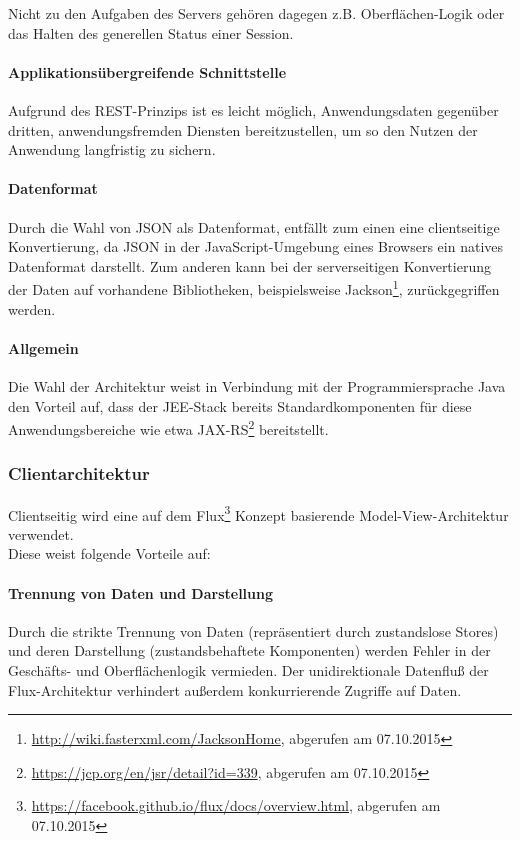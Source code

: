 \documentclass[12pt, xcolor=dvipsnames]{scrartcl}
\begin{document}
Nicht zu den Aufgaben des Servers gehören dagegen z.B. Oberflächen-Logik oder das Halten des generellen Status einer Session.

\paragraph{Applikationsübergreifende Schnittstelle}
Aufgrund des REST-Prinzips ist es leicht möglich, Anwendungsdaten gegenüber dritten, anwendungsfremden Diensten bereitzustellen, um so den Nutzen der Anwendung langfristig zu sichern.

\paragraph{Datenformat}
Durch die Wahl von JSON als Datenformat, entfällt zum einen eine clientseitige Konvertierung, da JSON in der JavaScript-Umgebung eines Browsers ein natives Datenformat darstellt. Zum anderen kann bei der serverseitigen Konvertierung der Daten auf vorhandene Bibliotheken, beispielsweise
Jackson\footnote{\url{http://wiki.fasterxml.com/JacksonHome}, abgerufen am 07.10.2015},
zurückgegriffen werden.

\paragraph{Allgemein}
Die Wahl der Architektur weist in Verbindung mit der Programmiersprache Java den Vorteil auf, dass der JEE-Stack bereits Standardkomponenten für diese Anwendungsbereiche wie etwa
JAX-RS\footnote{\url{https://jcp.org/en/jsr/detail?id=339}, abgerufen am 07.10.2015}
bereitstellt.


\subsubsection{Clientarchitektur}

Clientseitig wird eine auf dem
Flux\footnote{\url{https://facebook.github.io/flux/docs/overview.html}, abgerufen am 07.10.2015} Konzept basierende Model-View-Architektur verwendet. \\

Diese weist folgende Vorteile auf:

\paragraph{Trennung von Daten und Darstellung}
Durch die strikte Trennung von Daten (repräsentiert durch zustandslose Stores) und deren Darstellung (zustandsbehaftete Komponenten) werden Fehler in der Geschäfts- und Oberflächenlogik vermieden. Der unidirektionale Datenfluß der Flux-Architektur verhindert außerdem konkurrierende Zugriffe auf Daten.
\end{document}
